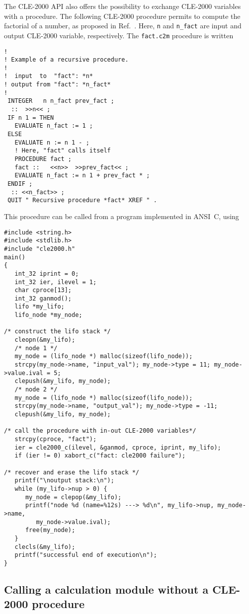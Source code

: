 The CLE-2000 API also offers the possibility to exchange CLE-2000 variables with a procedure. The following CLE-2000 procedure
permits to compute the factorial of a number, as proposed in Ref.~. Here, {\tt n} and {\tt n\_fact} are input and
output CLE-2000 variable, respectively. The {\tt fact.c2m} procedure is written
\begin{verbatim}
!
! Example of a recursive procedure.
!
!  input  to  "fact": *n*
! output from "fact": *n_fact*
!
 INTEGER   n n_fact prev_fact ;
  ::  >>n<< ;
 IF n 1 = THEN
   EVALUATE n_fact := 1 ;
 ELSE
   EVALUATE n := n 1 - ;
   ! Here, "fact" calls itself
   PROCEDURE fact ;
   fact ::   <<n>>  >>prev_fact<< ;
   EVALUATE n_fact := n 1 + prev_fact * ;
 ENDIF ;
  :: <<n_fact>> ;
 QUIT " Recursive procedure *fact* XREF " .
\end{verbatim}

This procedure can be called from a program implemented in ANSI~C, using
\begin{verbatim}
#include <string.h>
#include <stdlib.h>
#include "cle2000.h"
main()
{
   int_32 iprint = 0;
   int_32 ier, ilevel = 1;
   char cproce[13];
   int_32 ganmod();
   lifo *my_lifo;
   lifo_node *my_node;

/* construct the lifo stack */
   cleopn(&my_lifo);
   /* node 1 */
   my_node = (lifo_node *) malloc(sizeof(lifo_node));
   strcpy(my_node->name, "input_val"); my_node->type = 11; my_node->value.ival = 5;
   clepush(&my_lifo, my_node);
   /* node 2 */
   my_node = (lifo_node *) malloc(sizeof(lifo_node));
   strcpy(my_node->name, "output_val"); my_node->type = -11;
   clepush(&my_lifo, my_node);

/* call the procedure with in-out CLE-2000 variables*/
   strcpy(cproce, "fact");
   ier = cle2000_c(ilevel, &ganmod, cproce, iprint, my_lifo);
   if (ier != 0) xabort_c("fact: cle2000 failure");

/* recover and erase the lifo stack */
   printf("\noutput stack:\n");
   while (my_lifo->nup > 0) {
      my_node = clepop(&my_lifo);
      printf("node %d (name=%12s) ---> %d\n", my_lifo->nup, my_node->name,
         my_node->value.ival);
      free(my_node);
   }
   clecls(&my_lifo);
   printf("successful end of execution\n");
}
\end{verbatim}

\subsection {Calling a calculation module without a CLE-2000 procedure}

